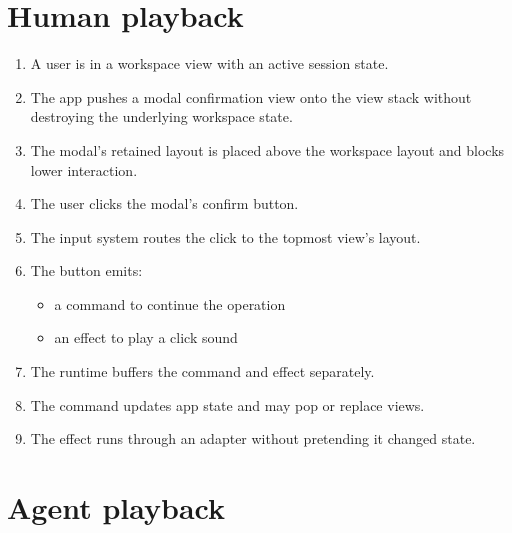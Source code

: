 \section{Human playback}\label{record-149-human-playback}

\begin{enumerate}
\def\labelenumi{\arabic{enumi}.}
\tightlist
\item
  A user is in a workspace view with an active session state.
\item
  The app pushes a modal confirmation view onto the view stack without destroying the underlying workspace state.
\item
  The modal's retained layout is placed above the workspace layout and blocks lower interaction.
\item
  The user clicks the modal's confirm button.
\item
  The input system routes the click to the topmost view's layout.
\item
  The button emits:

  \begin{itemize}
  \tightlist
  \item
    a command to continue the operation
  \item
    an effect to play a click sound
  \end{itemize}
\item
  The runtime buffers the command and effect separately.
\item
  The command updates app state and may pop or replace views.
\item
  The effect runs through an adapter without pretending it changed state.
\end{enumerate}

\section{Agent playback}\label{record-149-agent-playback}

